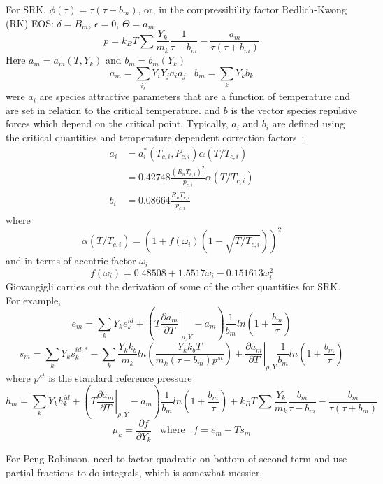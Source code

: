 \documentclass[11pt]{article}
\newcommand{\MarginPar}[1]{\marginpar{%
\vskip-\baselineskip %
\raggedright\tiny\sffamily
\hrule\smallskip{\color{red}#1}\par\smallskip\hrule}}
\begin{document}
For SRK, $\phi(\tau) = \tau(\tau+b_m)$, or, in the compressibility factor 
Redlich-Kwong (RK) EOS: $\delta = B_{m}$, $\epsilon = 0$, $\Theta = a_{m}$ \MarginPar{fix to be SRK}
\[
p = k_B T \sum \frac{Y_k}{m_k} \frac{1}{\tau - b_m} - \frac{a_m}{\tau(\tau + b_m)}
\]
Here $a_m = a_m(T, Y_k)$ and $b_m = b_m(Y_k)$
\[
a_m = \sum_{ij} Y_i Y_j a_i a_j \;\;\;  b_m = \sum_k Y_k b_k
\]
were $a_i$ are species attractive parameters that are a function of temperature and are
set in relation to the critical temperature. and $b$ is the vector species repulsive forces which depend on the critical point.
Typically, $a_i$ and $b_i$ are defined using the critical quantities and temperature dependent correction factors~\cite{poling2001properties}:
\begin{align}
a_i &= a_i^{*}\left(T_{c,i},P_{c,i}\right) \alpha(T/T_{c,i})  \nonumber \\
       &= 0.42748 \frac{\left(R_u T_{c,i} \right)^2}{p_{c,i}} \alpha \left(T/T_{c,i}\right)  \nonumber \\
 b_i &= 0.08664 \frac{R_u T_{c,i}}{p_{c,i}}   
       \label{eq:abformEOS}
\end{align}
where
\[
\alpha(T/T_{c,i}) = \left(1 + f\left( \omega_i \right) \left(1-\sqrt{T/T_{c,i}} \right) \right)^2
\]
and in terms of acentric factor $\omega_i$
\[
f\left( \omega_i \right) = 0.48508 + 1.5517 \omega_i - 0.151613 \omega_{i}^2
\]
Giovangigli carries out the derivation of some of the other quantities for SRK. For example,
\[
e_m = \sum_k Y_k e_k^{id} + \left( T \left . \frac{\partial a_m}{\partial T} \right |_{\rho,Y} - a_m \right)
\frac{1}{b_m} ln ( 1 + \frac{b_m}{\tau})
\]
\[
s_m = \sum_k Y_k s_k^{id,*} - \sum_k \frac{Y_k k_b}{m_k} ln  \left( \frac{Y_k k_b T}{m_k (\tau -b_m) p^{st}}   \right )
+ \left . \frac{\partial a_m}{\partial T} \right |_{\rho,Y} \frac{1}{b_m} ln ( 1 + \frac{b_m}{\tau})
\]
where $p^{st}$ is the standard reference pressure
\[
h_m = \sum_k Y_k h_k^{id} + \left ( T \left . \frac{\partial a_m}{\partial T} \right |_{\rho,Y} - a_m \right)
\frac{1}{b_m} ln ( 1 + \frac{b_m}{\tau})
+ 
k_B T \sum \frac{Y_k}{m_k} \frac{b_m}{\tau -b_m} - \frac{b_m}{\tau(\tau + b_m)}
\]
\[
\mu_k = \frac{\partial f}{\partial Y_k} \;\;\; \mathrm{where} \;\;\;  f = e_m - T s_m
\]

For Peng-Robinson, need to factor quadratic on bottom of second term and use partial fractions to do integrals, which is
somewhat messier.
\end{document}
